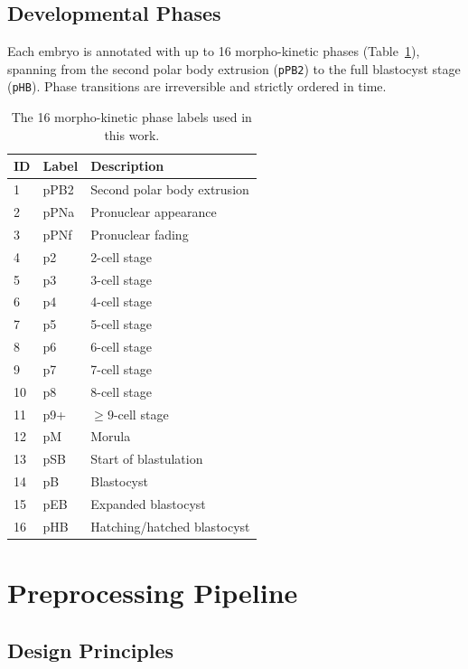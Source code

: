 \documentclass[12pt, a4paper, twoside]{report}
\begin{document}
\subsection{Developmental Phases}
\label{ssec:phases}

Each embryo is annotated with up to 16 morpho-kinetic phases
(Table~\ref{tab:phases}), spanning from the second polar body extrusion
(\texttt{pPB2}) to the full blastocyst stage (\texttt{pHB}).
Phase transitions are irreversible and strictly ordered in time.

\begin{table}[H]
\centering
\caption{The 16 morpho-kinetic phase labels used in this work.}
\label{tab:phases}
\begin{tabular}{lll}
\toprule
\textbf{ID} & \textbf{Label} & \textbf{Description} \\
\midrule
1  & pPB2  & Second polar body extrusion \\
2  & pPNa  & Pronuclear appearance \\
3  & pPNf  & Pronuclear fading \\
4  & p2    & 2-cell stage \\
5  & p3    & 3-cell stage \\
6  & p4    & 4-cell stage \\
7  & p5    & 5-cell stage \\
8  & p6    & 6-cell stage \\
9  & p7    & 7-cell stage \\
10 & p8    & 8-cell stage \\
11 & p9+   & ${\geq}9$-cell stage \\
12 & pM    & Morula \\
13 & pSB   & Start of blastulation \\
14 & pB    & Blastocyst \\
15 & pEB   & Expanded blastocyst \\
16 & pHB   & Hatching/hatched blastocyst \\
\bottomrule
\end{tabular}
\end{table}

\section{Preprocessing Pipeline}
\label{sec:preprocessing}

\subsection{Design Principles}
\label{ssec:preprocess_principles}
\end{document}
